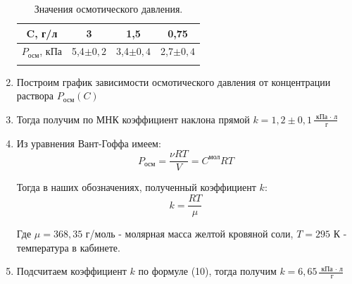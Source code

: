 \documentclass[a4paper, 12pt]{article}%
\begin{document}
\begin{enumerate}
	
	\begin{longtable}{|c|c|c|c|}
		\hline
	C, г/л	&  3  &  1,5 &  0,75 \\ \hline
	$P_{\text{осм}}$, кПа & 5,4$\pm 0,2$ & 3,4$\pm 0,4$& 2,7$\pm 0,4$ \\ \hline
	\caption{Значения осмотического давления.}
	\end{longtable}



\item Построим график зависимости осмотического давления от концентрации раствора 	$P_{\text{осм}}(C)$

\begin{figure}[H]
\end{figure}

\item Тогда получим по МНК коэффициент наклона прямой $k = 1,2 \pm 0,1 \frac{\text{ кПа } \cdot \text{ л}}{\text{ г}}$

\item Из уравнения Вант-Гоффа имеем: 
	\begin{equation}
		 P_{\text{осм}} = \frac{\nu RT}{V} = C^{\text{мол}} RT 
	\end{equation}

Тогда в наших обозначениях, полученный коэффициент $k$:  
\begin{equation}
	k = \frac{RT}{\mu}
\end{equation}

Где $\mu = 368,35$ г/моль - молярная масса желтой кровяной соли, $T = 295$ К - температура в кабинете. 

\item Подсчитаем коэффициент $k$ по формуле (10), тогда получим $k = 6, 65 \frac{\text{ кПа } \cdot \text{ л}}{\text{ г}}$  
\end{enumerate}
\end{document}
